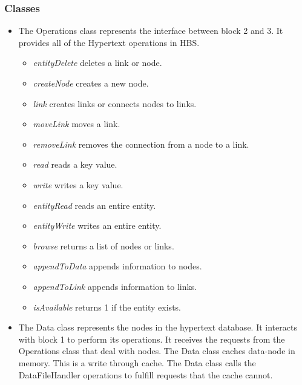 \subsubsection*{Classes}
\begin{itemize}
\item The Operations class represents the interface between block 2 and
  3.  It provides all of the Hypertext operations in HBS. \begin{itemize}
    \item{\em entityDelete} deletes a link or node.
    \item{\em createNode} creates a new node.
    \item{\em link} creates links or connects nodes to links.
    \item{\em moveLink} moves a link.
    \item{\em removeLink} removes the connection from a node to a link.
    \item{\em read} reads a key value.
    \item{\em write} writes a key value.
    \item{\em entityRead} reads an entire entity.
    \item{\em entityWrite} writes an entire entity.
    \item{\em browse} returns a list of nodes or links.
    \item{\em appendToData} appends information to nodes.
    \item{\em appendToLink} appends information to links.
    \item{\em isAvailable} returns 1 if the entity exists.
\end{itemize}

\item The Data class represents the nodes in the hypertext database.  It
  interacts with block 1 to perform its operations.  It receives the
  requests from the Operations class that deal with nodes. The Data class
  caches data-node in memory.  This is a write through cache. The Data
  class calls the DataFileHandler operations to fulfill requests that the
  cache cannot.


\end{itemize}
